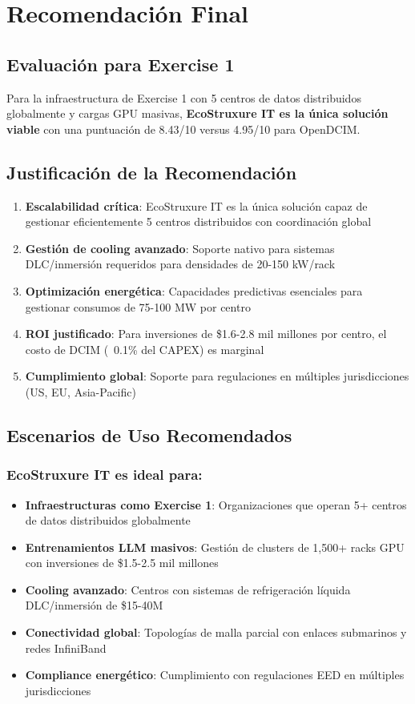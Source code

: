\documentclass[12pt,a4paper]{article}
\begin{document}
\section{Recomendación Final}

\subsection{Evaluación para Exercise 1}

Para la infraestructura de Exercise 1 con 5 centros de datos distribuidos globalmente y cargas GPU masivas, \textbf{EcoStruxure IT es la única solución viable} con una puntuación de 8.43/10 versus 4.95/10 para OpenDCIM.

\subsection{Justificación de la Recomendación}

\begin{enumerate}
    \item \textbf{Escalabilidad crítica}: EcoStruxure IT es la única solución capaz de gestionar eficientemente 5 centros distribuidos con coordinación global
    \item \textbf{Gestión de cooling avanzado}: Soporte nativo para sistemas DLC/inmersión requeridos para densidades de 20-150 kW/rack
    \item \textbf{Optimización energética}: Capacidades predictivas esenciales para gestionar consumos de 75-100 MW por centro
    \item \textbf{ROI justificado}: Para inversiones de \$1.6-2.8 mil millones por centro, el costo de DCIM (~0.1\% del CAPEX) es marginal
    \item \textbf{Cumplimiento global}: Soporte para regulaciones en múltiples jurisdicciones (US, EU, Asia-Pacific)
\end{enumerate}

\subsection{Escenarios de Uso Recomendados}

\subsubsection{EcoStruxure IT es ideal para:}
\begin{itemize}
    \item \textbf{Infraestructuras como Exercise 1}: Organizaciones que operan 5+ centros de datos distribuidos globalmente
    \item \textbf{Entrenamientos LLM masivos}: Gestión de clusters de 1,500+ racks GPU con inversiones de \$1.5-2.5 mil millones
    \item \textbf{Cooling avanzado}: Centros con sistemas de refrigeración líquida DLC/inmersión de \$15-40M
    \item \textbf{Conectividad global}: Topologías de malla parcial con enlaces submarinos y redes InfiniBand
    \item \textbf{Compliance energético}: Cumplimiento con regulaciones EED en múltiples jurisdicciones
\end{itemize}
\end{document}
